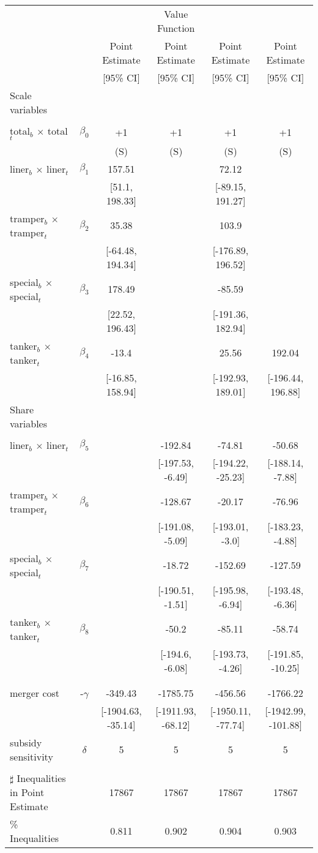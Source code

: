 \begin{tabular}{@{\extracolsep{5pt}}lccccc}
\toprule 
 &  &  & Value Function &  &  \\
 &  & Point Estimate & Point Estimate & Point Estimate & Point Estimate \\
 &  & [95\% CI] & [95\% CI] & [95\% CI] & [95\% CI] \\
\midrule 
Scale variables &  &  &  &  &  \\
 &  &  &  &  \\
total$_{b}$ $\times$ total$_{t}$ & $\beta_0$ & +1 & +1 & +1 & +1 \\
 &  & (S) & (S) & (S) & (S) \\
liner$_{b}$ $\times$ liner$_{t}$ & $\beta_1$ & 157.51 &  & 72.12 &  \\
 &  & [51.1, 198.33] &  & [-89.15, 191.27] &  \\
tramper$_{b}$ $\times$ tramper$_{t}$ & $\beta_2$ & 35.38 &  & 103.9 &  \\
 &  & [-64.48, 194.34] &  & [-176.89, 196.52] &  \\
special$_{b}$ $\times$ special$_{t}$ & $\beta_3$ & 178.49 &  & -85.59 &  \\
 &  & [22.52, 196.43] &  & [-191.36, 182.94] &  \\
tanker$_{b}$ $\times$ tanker$_{t}$ & $\beta_4$ & -13.4 &  & 25.56 & 192.04 \\
 &  & [-16.85, 158.94] &  & [-192.93, 189.01] & [-196.44, 196.88] \\
Share variables &  &  &  &  &  \\
 &  &  &  &  &  \\
liner$_{b}$ $\times$ liner$_{t}$ & $\beta_5$ &  & -192.84 & -74.81 & -50.68 \\
 &  &  & [-197.53, -6.49] & [-194.22, -25.23] & [-188.14, -7.88] \\
tramper$_{b}$ $\times$ tramper$_{t}$ & $\beta_6$ &  & -128.67 & -20.17 & -76.96 \\
 &  &  & [-191.08, -5.09] & [-193.01, -3.0] & [-183.23, -4.88] \\
special$_{b}$ $\times$ special$_{t}$ & $\beta_7$ &  & -18.72 & -152.69 & -127.59 \\
 &  &  & [-190.51, -1.51] & [-195.98, -6.94] & [-193.48, -6.36] \\
tanker$_{b}$ $\times$ tanker$_{t}$ & $\beta_8$ &  & -50.2 & -85.11 & -58.74 \\
 &  &  & [-194.6, -6.08] & [-193.73, -4.26] & [-191.85, -10.25] \\
 &  &  &  &  &  \\
 &  &  &  &  &  \\
merger cost & -$\gamma$ & -349.43 & -1785.75 & -456.56 & -1766.22 \\
 &  & [-1904.63, -35.14] & [-1911.93, -68.12] & [-1950.11, -77.74] & [-1942.99, -101.88] \\
subsidy sensitivity & $\delta$ & 5 & 5 & 5 & 5 \\
 &  &  &  &  &  \\
\hline 
$\sharp$ Inequalities in Point Estimate &  & 17867 & 17867 & 17867 & 17867 \\
\% Inequalities &  & 0.811 & 0.902 & 0.904 & 0.903 \\
\bottomrule 
\end{tabular}
